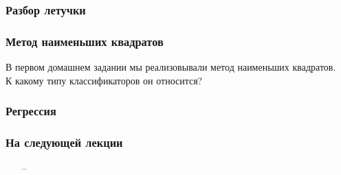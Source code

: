 \documentclass[12pt]{beamer}
\subtitle{Лекция 11. Линейная регрессия. PCA. AUC.}
\begin{document}
	
\frame{\titlepage}

\begin{frame}\frametitle{Разбор летучки}

\end{frame}

\begin{frame}\frametitle{Метод наименьших квадратов}
В первом домашнем задании мы реализовывали метод наименьших квадратов.\\
К какому типу классификаторов он относится?
\end{frame}

\begin{frame}\frametitle{Регрессия}

\end{frame}


\begin{frame}\frametitle{На следующей лекции}
\begin{itemize}
\item[--] 
\end{itemize}
\end{frame}
\end{document}
